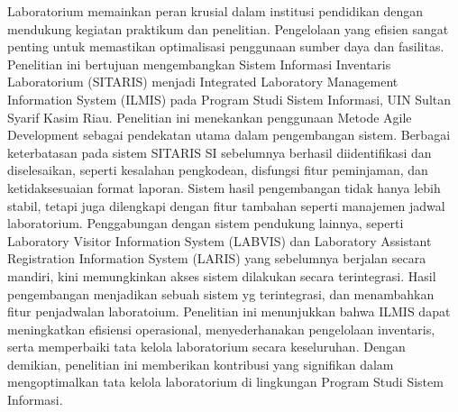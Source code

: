 \noindent
\fontsize{10pt}{12pt}\selectfont
Laboratorium memainkan peran krusial dalam institusi pendidikan dengan mendukung kegiatan praktikum dan penelitian. Pengelolaan yang efisien sangat penting untuk memastikan optimalisasi penggunaan sumber daya dan fasilitas. Penelitian ini bertujuan mengembangkan Sistem Informasi Inventaris Laboratorium (SITARIS) menjadi Integrated Laboratory Management Information System (ILMIS) pada Program Studi Sistem Informasi, UIN Sultan Syarif Kasim Riau. Penelitian ini menekankan penggunaan Metode Agile Development sebagai pendekatan utama dalam pengembangan sistem. Berbagai keterbatasan pada sistem SITARIS SI sebelumnya berhasil diidentifikasi dan diselesaikan, seperti kesalahan pengkodean, disfungsi fitur peminjaman, dan ketidaksesuaian format laporan. Sistem hasil pengembangan tidak hanya lebih stabil, tetapi juga dilengkapi dengan fitur tambahan seperti manajemen jadwal laboratorium. Penggabungan dengan sistem pendukung lainnya, seperti Laboratory Visitor Information System (LABVIS) dan Laboratory Assistant Registration Information System (LARIS) yang sebelumnya berjalan secara mandiri, kini memungkinkan akses sistem dilakukan secara terintegrasi. Hasil pengembangan menjadikan sebuah sistem yg terintegrasi, dan menambahkan fitur penjadwalan laboratoium. Penelitian ini menunjukkan bahwa ILMIS dapat meningkatkan efisiensi operasional, menyederhanakan pengelolaan inventaris, serta memperbaiki tata kelola laboratorium secara keseluruhan. Dengan demikian, penelitian ini memberikan kontribusi yang signifikan dalam mengoptimalkan tata kelola laboratorium di lingkungan Program Studi Sistem Informasi.\\
 \\
